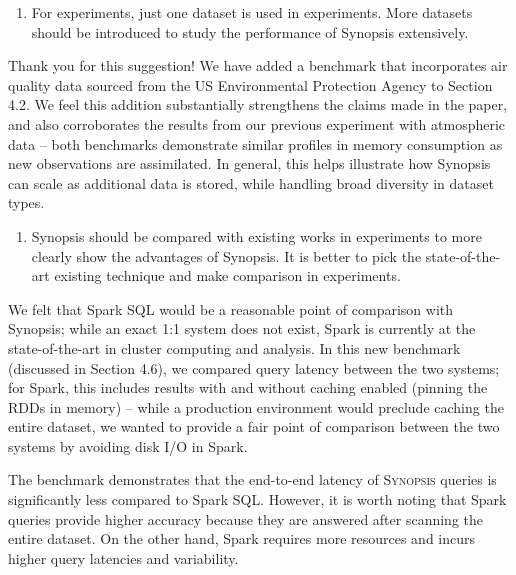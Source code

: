 \documentclass{article}
\begin{document}
\begin{enumerate}
\def\labelenumi{\arabic{enumi})}
\setcounter{enumi}{2}
\item
  For experiments, just one dataset is used in experiments. More
  datasets should be introduced to study the performance of Synopsis
  extensively.
\end{enumerate}

\begin{tcolorbox}
Thank you for this suggestion! We have added a benchmark that incorporates air quality data sourced from the US Environmental Protection Agency to Section 4.2. We feel this addition substantially strengthens the claims made in the paper, and also corroborates the results from our previous experiment with atmospheric data -- both benchmarks demonstrate similar profiles in memory consumption as new observations are assimilated. In general, this helps illustrate how Synopsis can scale as additional data is stored, while handling broad diversity in dataset types.
\end{tcolorbox}

\begin{enumerate}
\def\labelenumi{\arabic{enumi})}
\setcounter{enumi}{3}
\item
  Synopsis should be compared with existing works in experiments to more
  clearly show the advantages of Synopsis. It is better to pick the
  state-of-the-art existing technique and make comparison in
  experiments.
\end{enumerate}

\begin{tcolorbox}
    We felt that Spark SQL would be a reasonable point of comparison with Synopsis; while an exact 1:1 system does not exist, Spark is currently at the state-of-the-art in cluster computing and analysis. In this new benchmark (discussed in Section 4.6), we compared query latency between the two systems; for Spark, this includes results with and without caching enabled (pinning the RDDs in memory) -- while a production environment would preclude caching the entire dataset, we wanted to provide a fair point of comparison between the two systems by avoiding disk I/O in Spark.
    
    The benchmark demonstrates that the end-to-end latency of \textsc{Synopsis} queries is significantly less compared to Spark SQL. However, it is worth noting that Spark queries provide higher accuracy because they are answered after scanning the entire dataset. On the other hand, Spark requires more resources and incurs higher query latencies and variability.
\end{tcolorbox}
\end{document}
